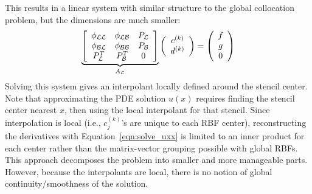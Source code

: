 \documentclass[11pt]{report}
\begin{document}
{This results in a linear system with similar structure to the global collocation problem, but the dimensions are much smaller:
\begin{eqnarray}
\underbrace{\left[ \begin{array}{c c c} 
	\phi_{\mathcal{L}\mathcal{L}} & \phi_{\mathcal{L}\mathcal{B}} & P_{\mathcal{L}} \\
	\phi_{\mathcal{B}\mathcal{L}} & \phi_{\mathcal{B}\mathcal{B}} & P_{\mathcal{B}} \\
	P^T_{\mathcal{L}} & P^T_{\mathcal{B}} & 0 \\
	\end{array} \right]}_{A_{\mathcal{L}}} \left( \begin{array}{c}
							{c}^{(k)} \\
							{d}^{(k)}
							 \end{array}
						 \right) = \left( \begin{array}{c}
							{f} \\
							{g} \\
							0
							 \end{array}
						 \right) 
	\label{eqn:local_method}
\end{eqnarray}
Solving this system gives an interpolant locally defined around the stencil center. Note that approximating the PDE solution $u(x)$ requires finding the stencil center nearest $x$, then using the local interpolant for that stencil. Since interpolation is local (i.e., $c_j^{(k)}$'s are unique to each RBF center), reconstructing the derivatives with Equation~\ref{eqn:solve_uxx} is limited to an inner product for each center rather than the matrix-vector grouping possible with global RBFs.  
This approach decomposes the problem into smaller and more manageable parts. However, because the interpolants are local, there is no notion of global continuity/smoothness of the solution. 




}
\end{document}
